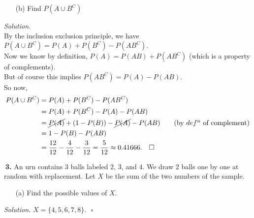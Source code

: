 \documentclass[12pt]{report}
\begin{document}
\begin{itemize}
\item [(b)] Find $P(A \cup B^C)$			%
\end{itemize}
\textit{Solution. } \\
By the inclusion exclusion principle, we have \\
$P(A \cup B^C)=P(A)+P(B^C)-P(AB^C)$.\\

\noindent Now we know by definition, $P(A)=P(AB)+P(AB^C)$ (which is a property of complements).\\
But of course this implies $P(AB^C)=P(A)-P(AB)$.\\

\noindent So now, 
\begin{align*}
P(A \cup B^C)&=P(A)+P(B^C)-P(AB^C)\\
&=P(A)+P(B^C)-P(A)-P(AB)\\
&=\cancel{P(A)}+(1-P(B))-\cancel{P(A)}-P(AB)	\tag{by $def^n$ of complement}\\
&=1-P(B)-P(AB)\\
&=\frac{12}{12}-\frac{4}{12}-\frac{3}{12}=\frac{5}{12}\approx0.41666.~~~\square
\end{align*}
\pagebreak





\noindent {} $~$\textbf{3.} An urn contains 3 balls labeled 2, 3, and 4. We draw 2 balls one by one at random with replacement. Let $X$ be the sum of the two numbers of the sample.
\begin{itemize}
\item [(a)] Find the possible values of $X$.		%
\end{itemize}
\textit{Solution. } $X=\{4,5,6,7,8\}.~~~\square$
\end{document}
